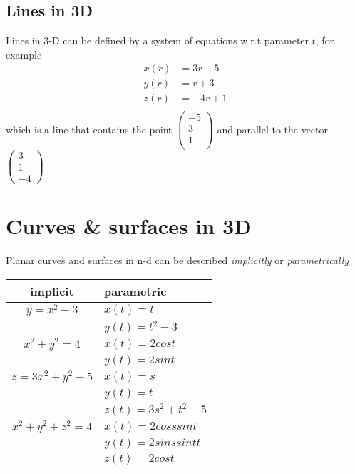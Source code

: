 \subsection {Lines in 3D}
\begin{framed}
   Lines in 3-D can be defined by a system of equations w.r.t parameter $t$, for example
   \begin{align*}
         x(r) &= 3r - 5 \\
         y(r) &= r + 3\\
         z(r) &= -4r + 1\\
   \end{align*}
   which is a line that contains the point $\begin{pmatrix}-5 \\ 3\\ 1\\ \end{pmatrix}$ and parallel to the vector $\begin{pmatrix} 3 \\ 1 \\ -4 \end{pmatrix}$ 
\end{framed}



\section{Curves \& surfaces in 3D}

Planar curves and surfaces in n-d can be described \emph{implicitly} or \emph{parametrically}

\begin{center}
   \begin{tabular}{|c|l|}
      \hline
      implicit & parametric \\

      \hline
      $y = x^2 - 3$ & $x(t) = t$ \\
                    & $y(t) = t^2 - 3$ \\
      \hline

      $x^2 + y^2 = 4$ & $x(t) = 2cost$ \\
                    & $y(t) = 2sint$ \\
      \hline
      $z = 3x^2 + y^2 -5$ & $x(t) = s$ \\
                          & $y(t) = t$ \\
                          & $z(t) = 3s^2 + t^2 -5$ \\
      \hline
      $x^2 + y^2 + z^2 =4$ & $x(t) = 2cosssint$ \\
                           & $y(t) = 2sinssintt$ \\
                           & $z(t) = 2cost$ \\
      \hline
  \end{tabular}
\end{center}

